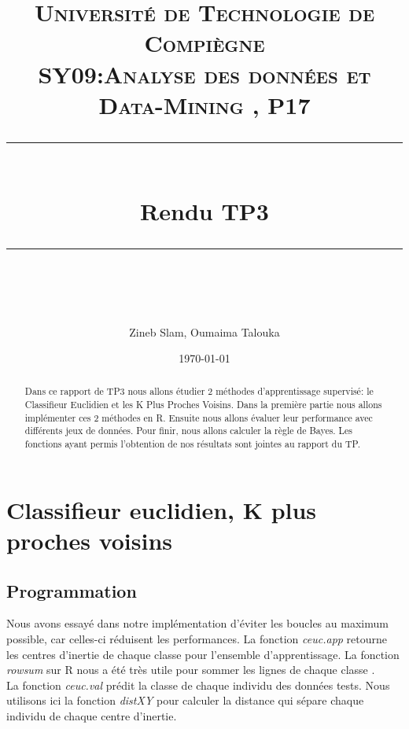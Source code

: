 \documentclass[10pt]{article}
\title{
	\normalfont \normalsize 
	\textsc{Université de Technologie de Compiègne\\ 
		SY09:Analyse des données et Data-Mining , P17} \\
	[10pt] 
	\rule{\linewidth}{0.5pt} \\[6pt] 
	\huge Rendu TP3\\
	\rule{\linewidth}{2pt}  \\[10pt]
}
\author{Zineb Slam, Oumaima Talouka}
\date{\normalsize \today}
\begin{document}
	{\let\newpage\relax\maketitle}	
	
		\begin{abstract}
			Dans ce rapport de TP3 nous allons étudier 2 méthodes d'apprentissage supervisé: le Classifieur Euclidien et les K Plus Proches Voisins. Dans la première partie nous allons implémenter ces 2 méthodes en R. Ensuite nous allons évaluer leur performance avec différents jeux de données. Pour finir, nous allons calculer la règle de Bayes. Les fonctions ayant permis l'obtention de nos résultats sont jointes au rapport du TP.
		\end{abstract}
	
	\section{Classifieur euclidien, K plus proches voisins}
		\subsection{ Programmation}
		Nous avons essayé dans notre implémentation d'éviter les boucles au maximum possible, car celles-ci réduisent les performances.
	La fonction \textit{ceuc.app } retourne les centres d'inertie de chaque classe pour l'ensemble d'apprentissage. La fonction \textit{rowsum} sur R nous a été très utile pour sommer les lignes de chaque classe .\\
	La fonction \textit{ceuc.val}  prédit la classe de chaque individu des données tests. Nous utilisons ici la fonction \textit{distXY} pour calculer la distance qui sépare chaque individu de chaque centre d'inertie.
	
	
\end{document}

